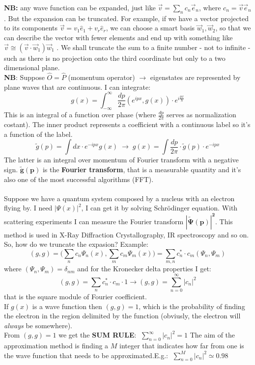 \textbf{NB:} any wave function can be expanded, just like $\vec{v} = \sum_n c_n \vec{e}_n$, where $c_n = \vec{v} \vec{e}_n$. But the expansion can be truncated. For example, if we have a vector projected to its components $\vec v = v_1\hat{e}_1+v_r\hat{e}_r$, we can choose a smart basis ${\vec{w}_1, \vec{w}_2}$, so that we can describe the vector with fewer elements and end up with something like $ \vec{v} \cong (\vec{v} \cdot \vec{w}_1) \vec{w}_1 $ .
We shall truncate the sum to a finite number - not to infinite - such as there is no projection onto the third coordinate but only to a two dimensional plane.\\


\textbf{NB}: Suppose $\hat{O}=\hat{P}$ (momentum operator) $\rightarrow$ eigenstates are represented by plane waves that are continuous. I can integrate:\\
\[
g(x)=\int_{-\infty}^{\infty}\frac{dp}{2\pi}(e^{ipx},g(x))\cdot e^{i\frac{px}{\hbar}}
\]
This is an integral of a function over phase (where $\frac{dp}{2\pi}$ serves as normalization costant). The inner product represents a coefficient with a continuous label so it's a function of the label.
\[
\tilde{g}(p)=\int dx\cdot e^{-ipx}g(x)\; \rightarrow \; g(x)=\int \frac{dp}{2\pi} \cdot \tilde{g}(p) \cdot e^{-ipx}
\]
The latter is an integral over momentum of Fourier transform with a negative sign.
$\mathbf{\tilde{g}(p)}$ is the \textbf{Fourier transform}, that is a measurable quantity and it's also one of the most successful algorithms (FFT).\\
\\
Suppose we have a quantum system composed by a nucleus with an electron flying by. I need $|\Psi(x)|^2$, I can get it by solving Schr{\"o}dinger equation. With scattering experiments I can measure the Fourier transform $\mathbf{|\tilde{\Psi}(p)|^2}$. This method is used in X-Ray Diffraction Crystallography, IR spectroscopy and so on.
\newline
So, how do we truncate the expasion? Example:
\[
(g,g)=\biggl(\sum_nc_n\Psi_n(x), \sum_mc_m\Psi_m(x)\biggr) = \sum_{m,n}c_n^*\cdot c_m(\Psi_n, \Psi_m)
\]
where $(\Psi_n,\Psi_m)=\delta_{nm}$ and for the Kronecker delta properties I get:
\[
(g,g)= \sum_nc_n^* \cdot c_m \cdot 1 \rightarrow (g,g)=\sum_{n=0}^{\infty}|c_n|^2
\]
that is the square module of Fourier coefficient.\\
If $g(x)$ is a wave function then $(g,g)=1$, which is the probability of finding the electron in the region delimited by the function (obviusly, the electron will \textit{always} be somewhere).\\
\newline
From $(g,g)=1$ we get the \textbf{SUM RULE}: $\; \sum_{n=0}^{\infty}|c_n|^2=1$
The aim of the approximation method is finding a $M$ integer that indicates how far from one is the wave function that needs to be approximated.E.g.: $\; \sum_{n=0}^{M}|c_n|^2 \simeq 0.98$\\

